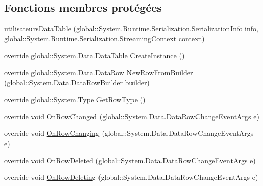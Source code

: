 \subsection*{Fonctions membres protégées}
\begin{DoxyCompactItemize}
\item 
\hyperlink{classforma_1_1formadb_data_set_1_1utilisateurs_data_table_af9c845395b1e6022b9e5703f1d41d895}{utilisateurs\+Data\+Table} (global\+::\+System.\+Runtime.\+Serialization.\+Serialization\+Info info, global\+::\+System.\+Runtime.\+Serialization.\+Streaming\+Context context)
\item 
override global\+::\+System.\+Data.\+Data\+Table \hyperlink{classforma_1_1formadb_data_set_1_1utilisateurs_data_table_ab1496f8f1f44fb89ac3d198b0814b972}{Create\+Instance} ()
\item 
override global\+::\+System.\+Data.\+Data\+Row \hyperlink{classforma_1_1formadb_data_set_1_1utilisateurs_data_table_a53f4c7edea5e38a76e63b221978f55fa}{New\+Row\+From\+Builder} (global\+::\+System.\+Data.\+Data\+Row\+Builder builder)
\item 
override global\+::\+System.\+Type \hyperlink{classforma_1_1formadb_data_set_1_1utilisateurs_data_table_a812746d58865c2eb9e4e78e6a1176586}{Get\+Row\+Type} ()
\item 
override void \hyperlink{classforma_1_1formadb_data_set_1_1utilisateurs_data_table_af6087f07100d4316df068f8f729c1366}{On\+Row\+Changed} (global\+::\+System.\+Data.\+Data\+Row\+Change\+Event\+Args e)
\item 
override void \hyperlink{classforma_1_1formadb_data_set_1_1utilisateurs_data_table_a5917e16afac58f5485a6c95f78546c10}{On\+Row\+Changing} (global\+::\+System.\+Data.\+Data\+Row\+Change\+Event\+Args e)
\item 
override void \hyperlink{classforma_1_1formadb_data_set_1_1utilisateurs_data_table_a192555a4e5908536f44cf4cc352ac592}{On\+Row\+Deleted} (global\+::\+System.\+Data.\+Data\+Row\+Change\+Event\+Args e)
\item 
override void \hyperlink{classforma_1_1formadb_data_set_1_1utilisateurs_data_table_a64d712724eaaecda057b0856d3ac7b78}{On\+Row\+Deleting} (global\+::\+System.\+Data.\+Data\+Row\+Change\+Event\+Args e)
\end{DoxyCompactItemize}
